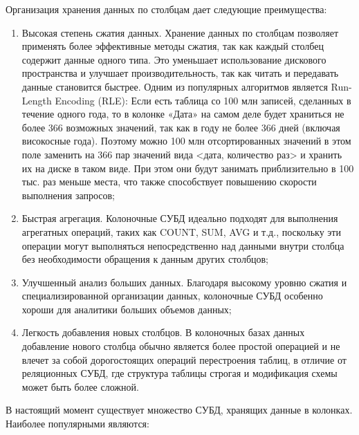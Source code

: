\documentclass[14pt, russian]{scrartcl}
\begin{document}
Организация хранения данных по столбцам дает следующие преимущества:

\begin{enumerate}
	\item Высокая степень сжатия данных. Хранение данных по столбцам позволяет применять более эффективные методы сжатия, так как каждый столбец содержит данные одного типа. Это уменьшает использование дискового пространства и улучшает производительность, так как читать и передавать данные становится быстрее. Одним из популярных алгоритмов является Run-Length Encoding (RLE): Если есть таблица со 100 млн записей, сделанных в течение одного года, то в колонке «Дата» на самом деле будет храниться не более 366 возможных значений, так как в году не более 366 дней (включая високосные года). Поэтому можно 100 млн отсортированных значений в этом поле заменить на 366 пар значений вида <дата, количество раз> и хранить их на диске в таком виде. При этом они будут занимать приблизительно в 100 тыс. раз меньше места, что также способствует повышению скорости выполнения запросов;
	\item Быстрая агрегация. Колоночные СУБД идеально подходят для выполнения агрегатных операций, таких как COUNT, SUM, AVG и т.д., поскольку эти операции могут выполняться непосредственно над данными внутри столбца без необходимости обращения к данным других столбцов;
	\item Улучшенный анализ больших данных. Благодаря высокому уровню сжатия и специализированной организации данных, колоночные СУБД особенно хороши для аналитики больших объемов данных;
	\item Легкость добавления новых столбцов. В колоночных базах данных добавление нового столбца обычно является более простой операцией и не влечет за собой дорогостоящих операций перестроения таблиц, в отличие от реляционных СУБД, где структура таблицы строгая и модификация схемы может быть более сложной.
\end{enumerate}


В настоящий момент существует множество СУБД, хранящих данные в колонках. Наиболее популярными являются:
\end{document}
